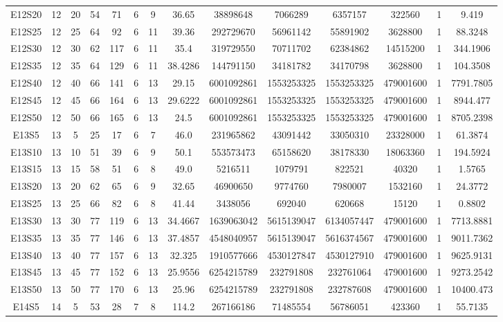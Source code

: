 \documentclass[letter, 10pt]{article}
\begin{document}
\begin{landscape}
\begin{longtable}{|c|c|c|c|c|c|c|c|c|c|c|c|c|c|}
E12S20 & 12 & 20 & 54 & 71 & 6 & 9 & 36.65 & 38898648 & 7066289 & 6357157 & 322560 & 1 & 9.419 \\
E12S25 & 12 & 25 & 64 & 92 & 6 & 11 & 39.36 & 292729670 & 56961142 & 55891902 & 3628800 & 1 & 88.3248 \\
E12S30 & 12 & 30 & 62 & 117 & 6 & 11 & 35.4 & 319729550 & 70711702 & 62384862 & 14515200 & 1 & 344.1906 \\
E12S35 & 12 & 35 & 64 & 129 & 6 & 11 & 38.4286 & 144791150 & 34181782 & 34170798 & 3628800 & 1 & 104.3508 \\
E12S40 & 12 & 40 & 66 & 141 & 6 & 13 & 29.15 & 6001092861 & 1553253325 & 1553253325 & 479001600 & 1 & 7791.7805 \\
E12S45 & 12 & 45 & 66 & 164 & 6 & 13 & 29.6222 & 6001092861 & 1553253325 & 1553253325 & 479001600 & 1 & 8944.477 \\
E12S50 & 12 & 50 & 66 & 165 & 6 & 13 & 24.5 & 6001092861 & 1553253325 & 1553253325 & 479001600 & 1 & 8705.2398 \\
E13S5 & 13 & 5 & 25 & 17 & 6 & 7 & 46.0 & 231965862 & 43091442 & 33050310 & 23328000 & 1 & 61.3874 \\
E13S10 & 13 & 10 & 51 & 39 & 6 & 9 & 50.1 & 553573473 & 65158620 & 38178330 & 18063360 & 1 & 194.5924 \\
E13S15 & 13 & 15 & 58 & 51 & 6 & 8 & 49.0 & 5216511 & 1079791 & 822521 & 40320 & 1 & 1.5765 \\
E13S20 & 13 & 20 & 62 & 65 & 6 & 9 & 32.65 & 46900650 & 9774760 & 7980007 & 1532160 & 1 & 24.3772 \\
E13S25 & 13 & 25 & 66 & 82 & 6 & 8 & 41.44 & 3438056 & 692040 & 620668 & 15120 & 1 & 0.8802 \\
E13S30 & 13 & 30 & 77 & 119 & 6 & 13 & 34.4667 & 1639063042 & 5615139047 & 6134057447 & 479001600 & 1 & 7713.8881 \\
E13S35 & 13 & 35 & 77 & 146 & 6 & 13 & 37.4857 & 4548040957 & 5615139047 & 5616374567 & 479001600 & 1 & 9011.7362 \\
E13S40 & 13 & 40 & 77 & 157 & 6 & 13 & 32.325 & 1910577666 & 4530127847 & 4530127910 & 479001600 & 1 & 9625.9131 \\
E13S45 & 13 & 45 & 77 & 152 & 6 & 13 & 25.9556 & 6254215789 & 232791808 & 232761064 & 479001600 & 1 & 9273.2542 \\
E13S50 & 13 & 50 & 77 & 170 & 6 & 13 & 25.96 & 6254215789 & 232791808 & 232787608 & 479001600 & 1 & 10400.473 \\
E14S5 & 14 & 5 & 53 & 28 & 7 & 8 & 114.2 & 267166186 & 71485554 & 56786051 & 423360 & 1 & 55.7135 \\

\end{longtable}
\end{landscape}
\end{document}
